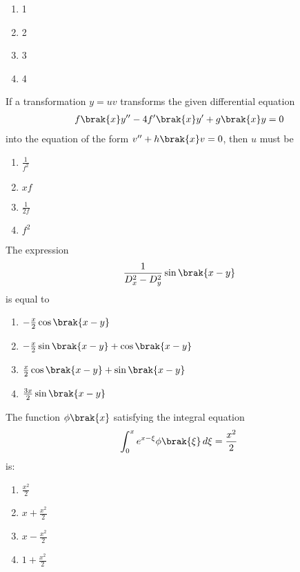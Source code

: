 \begin{enumerate} \item 1 \item 2 \item 3 \item 4
\end{enumerate}

\item If a transformation $y = u v$ transforms the given differential equation \begin{align*} f \brak{x} y^{\prime\prime} - 4 f^\prime \brak{x} y^\prime + g \brak{x} y = 0 
\end{align*} into the equation of the form $v^{\prime\prime} + h \brak{x} v = 0$, then $u$ must be

\begin{enumerate} \item $\frac{1}{f^2}$ \item $x f$ \item $\frac{1}{2 f}$ \item $f^2$
\end{enumerate}

\item The expression \begin{align*} \frac{1}{D_x^2 - D_y^2} \sin \brak{x - y} \end{align*} is equal to

\begin{enumerate} \item $-\frac{x}{2} \cos \brak{x - y}$ \item $-\frac{x}{2} \sin \brak{x - y} + \cos \brak{x - y}$ \item $\frac{x}{2} \cos \brak{x - y} + \sin \brak{x - y}$ 
    \item $\frac{3x}{2} \sin \brak{x - y}$
\end{enumerate}

\item The function $\phi \brak{x}$ satisfying the integral equation \begin{align*} \int_0^x e^{x-\xi} \phi \brak{\xi} \, d\xi = \frac{x^2}{2} \end{align*} is:

\begin{enumerate} \item $\frac{x^2}{2}$ \item $x + \frac{x^2}{2}$ \item $x - \frac{x^2}{2}$ \item $1 + \frac{x^2}{2}$
\end{enumerate}

